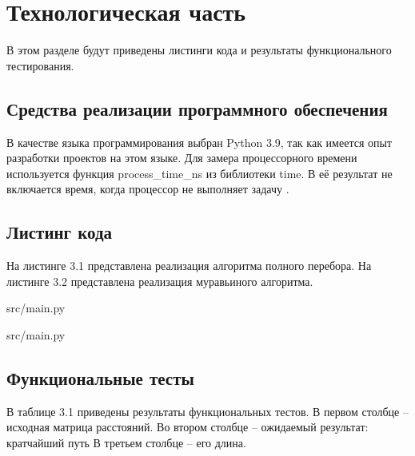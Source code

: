 \chapter{Технологическая часть}
В этом разделе будут приведены листинги кода и результаты функционального тестирования.

\section{Средства реализации программного обеспечения}
В качестве языка программирования выбран Python 3.9, так как имеется опыт разработки проектов на этом языке.
Для замера процессорного времени используется функция process\_time\_ns из библиотеки time. 
В её результат не включается время, когда процессор не выполняет задачу \cite{python}.

\section{Листинг кода}
\FloatBarrier
На листинге 3.1 представлена реализация алгоритма полного перебора.
На листинге 3.2 представлена реализация муравьиного алгоритма. 

\begin{lstinputlisting}[language=Python, caption=Реализация алгоритма полного перебора, linerange={5-23}, 
	basicstyle=\footnotesize\ttfamily, frame=single,breaklines=true]{src/main.py}
\end{lstinputlisting}
\FloatBarrier

\FloatBarrier
\begin{lstinputlisting}[language=Python, caption=Реализация муравьиного алгоритма, linerange={24-121}, 
	basicstyle=\footnotesize\ttfamily, frame=single, breaklines=true]{src/main.py}
\end{lstinputlisting}
\FloatBarrier

\section{Функциональные тесты}
В таблице 3.1 приведены результаты функциональных тестов. 
В первом столбце -- исходная матрица расстояний.
Во втором столбце -- ожидаемый результат: кратчайший путь
В третьем столбце -- его длина.

